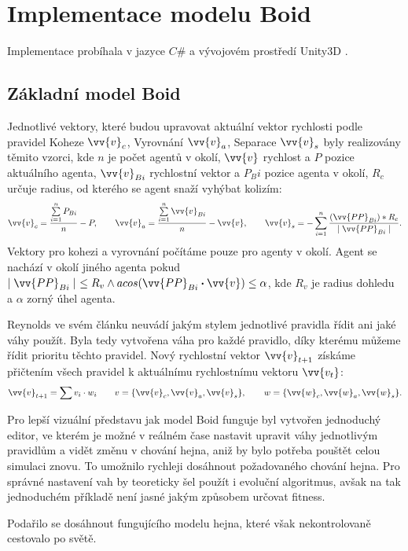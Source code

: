 \section{Implementace modelu Boid}
Implementace probíhala v jazyce $C\#$ a vývojovém prostředí Unity3D \cite{Unity}. 
\subsection{Základní model Boid}
Jednotlivé vektory, které budou upravovat aktuální vektor rychlosti podle pravidel Koheze $\vv{v}_c$, Vyrovnání $\vv{v}_a$, Separace $\vv{v}_s$ byly realizovány těmito vzorci, kde $n$ je počet agentů v okolí, $\vv{v}$ rychlost a $P$ pozice aktuálního agenta, $\vv{v}_{Bi}$ rychlostní vektor a $P_Bi$ pozice agenta v okolí, $R_c$ určuje radius, od kterého se agent snaží vyhýbat kolizím: 
\begin{equation*}
\vv{v}_c = \frac{ \sum\limits_{i=1}^n{P_{Bi} } }{ n } - P, \qquad
\vv{v}_a = \frac{ \sum\limits_{i=1}^n{\vv{v}_{Bi} } }{ n } - \vv{v}, \qquad
\vv{v}_s = -\sum\limits_{i=1}^n{ \frac{(\vv{PP}_{Bi}) * R_c}{\mid \vv{PP}_{Bi}\mid}}.
\end{equation*}
Vektory pro kohezi a vyrovnání počítáme pouze pro agenty v okolí. Agent se nachází v okolí jiného agenta pokud $\mid\vv{PP}_{Bi}\mid \ \leq R_v \land acos(\vv{PP}_{Bi} \boldsymbol{\cdot} \vv{v}) \leq \alpha $, kde $R_v$ je radius dohledu a $\alpha$ zorný úhel agenta. 
\par
Reynolds ve svém článku neuvádí jakým stylem jednotlivé pravidla řídit ani jaké váhy použít. Byla tedy vytvořena váha pro každé pravidlo, díky kterému můžeme řídit prioritu těchto pravidel. Nový rychlostní vektor $\vv{v}_{t+1}$ získáme přičtením všech pravidel k aktuálnímu rychlostnímu vektoru $\vv{v_t}$: 
\begin{equation*}
\vv{v}_{t+1} = \sum{v_i \cdot w_i} \qquad v = \{\vv{v}_c, \vv{v}_a, \vv{v}_s\}, \qquad w = \{\vv{w}_c, \vv{w}_a, \vv{w}_s\}. 
\end{equation*}
\par
Pro lepší vizuální představu jak model Boid funguje byl vytvořen jednoduchý editor, ve kterém je možné v reálném čase nastavit upravit váhy jednotlivým pravidlům a vidět změnu v chování hejna, aniž by bylo potřeba pouštět celou simulaci znovu. To umožnilo rychleji dosáhnout požadovaného chování hejna. Pro správné nastavení vah by teoreticky šel použít i evoluční algoritmus, avšak na tak jednoduchém příkladě není jasné jakým způsobem určovat fitness. 
\par
Podařilo se dosáhnout fungujícího modelu hejna, které však nekontrolovaně cestovalo po světě. 

